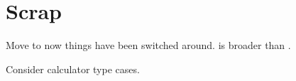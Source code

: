 \section{Scrap}

\begin{note}
  {
    \color{red}
    Move to \requ{} now things have been switched around.
  }
  \fc{} is broader than \requ{}.

  Consider calculator type cases.
\end{note}


